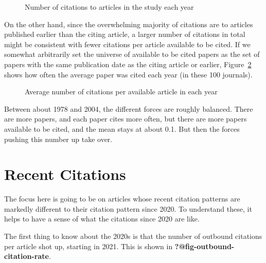 \documentclass[
  10pt,
  letterpaper,
  DIV=11,
  numbers=noendperiod,
  twoside]{scrartcl}
\begin{document}
\begin{figure}


\caption{\label{fig-number-of-citations-by-year}Number of citations to
articles in the study each year}

\end{figure}%

On the other hand, since the overwhelming majority of citations are to
articles published earlier than the citing article, a larger number of
citations in total might be consistent with fewer citations per article
available to be cited. If we somewhat arbitrarily set the universe of
available to be cited papers as the set of papers with the same
publication date as the citing article or earlier,
Figure~\ref{fig-average-of-citations-by-year} shows how often the
average paper was cited each year (in these 100 journals).

\begin{figure}


\caption{\label{fig-average-of-citations-by-year}Average number of
citations per available article in each year}

\end{figure}%

Between about 1978 and 2004, the different forces are roughly balanced.
There are more papers, and each paper cites more often, but there are
more papers available to be cited, and the mean stays at about 0.1. But
then the forces pushing this number up take over.

\section{Recent Citations}\label{sec-recent-citations}

The focus here is going to be on articles whose recent citation patterns
are markedly different to their citation pattern since 2020. To
understand these, it helps to have a sense of what the citations since
2020 are like.

The first thing to know about the 2020s is that the number of outbound
citations per article shot up, starting in 2021. This is shown in
\textbf{?@fig-outbound-citation-rate}.
\end{document}
